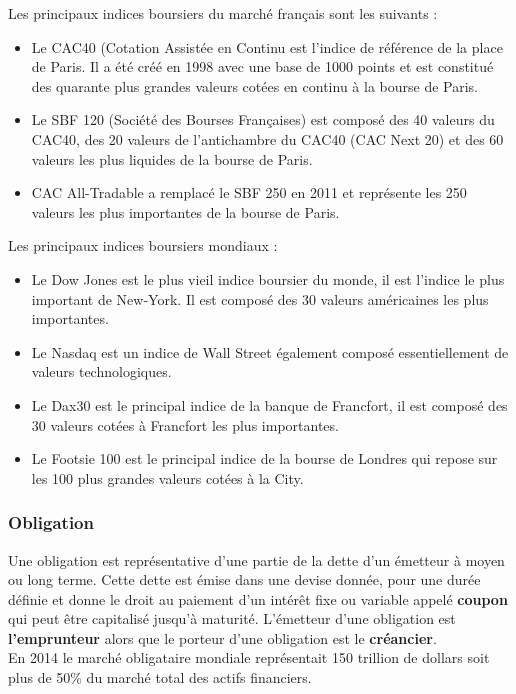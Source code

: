 Les principaux indices boursiers du marché français sont les suivants :
\begin{itemize}
\item Le CAC40 (Cotation Assistée en Continu est l'indice de référence de la place de Paris. Il a été créé en 1998 avec une base de 1000 points et est constitué des quarante plus grandes valeurs cotées en continu à la bourse de Paris. 
\item Le SBF 120 (Société des Bourses Françaises) est composé des 40 valeurs du CAC40, des 20 valeurs de l'antichambre du CAC40 (CAC Next 20) et des 60 valeurs les plus liquides de la bourse de Paris.
\item CAC All-Tradable a remplacé le SBF 250 en 2011 et représente les 250 valeurs les plus importantes de la bourse de Paris.  
\end{itemize}

Les principaux indices boursiers mondiaux : 
\begin{itemize}
\item Le Dow Jones est le plus vieil indice boursier du monde, il est l'indice le plus important de New-York. Il est composé des 30 valeurs américaines les plus importantes. 
\item Le Nasdaq est un indice de Wall Street également composé essentiellement de valeurs technologiques. 
\item Le Dax30 est le principal indice de la banque de Francfort, il est composé des 30 valeurs cotées à Francfort les plus importantes.
\item Le Footsie 100 est le principal indice de la bourse de Londres qui repose sur les 100 plus grandes valeurs cotées à la City. 
\end{itemize}

\subsubsection{Obligation}
Une obligation est représentative d'une partie de la dette d'un émetteur à moyen ou long terme. Cette dette est émise dans une devise donnée, pour une durée définie et donne le droit au paiement d'un intérêt fixe ou variable appelé \textbf{coupon} qui peut être capitalisé jusqu'à maturité. L'émetteur d'une obligation est \textbf{l'emprunteur} alors que le porteur d'une obligation est le \textbf{créancier}. \\

En 2014 le marché obligataire mondiale représentait 150 trillion de dollars soit plus de 50\% du marché total des actifs financiers. \\

